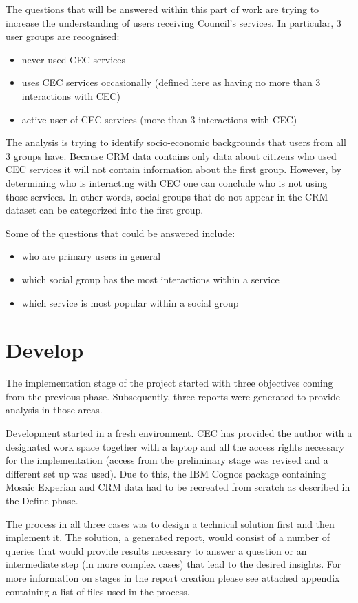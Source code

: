 The questions that will be answered within this part of work are trying to increase the understanding of users receiving Council’s services. In particular, 3 user groups are recognised:
\begin{itemize}
\item never used CEC services
\item uses CEC services occasionally (defined here as having no more than 3 interactions with CEC)
\item active user of CEC services (more than 3 interactions with CEC)
\end{itemize}

The analysis is trying to identify socio-economic backgrounds that users from all 3 groups have. Because CRM data contains only data about citizens who used CEC services it will not contain information about the first group. However, by determining who is interacting with CEC one can conclude who is not using those services. In other words, social groups that do not appear in the CRM dataset can be categorized into the first group.

Some of the questions that could be answered include:
\begin{itemize}
\item who are primary users in general
\item which social group has the most interactions within a service
\item which service is most popular within a social group
\end{itemize}

	\section{Develop}
	
The implementation stage of the project started with three objectives coming from the previous phase. Subsequently, three reports were generated to provide analysis in those areas.

Development started in a fresh environment. CEC has provided the author with a designated work space together with a laptop and all the access rights necessary for the implementation (access from the preliminary stage was revised and a different set up was used). Due to this, the IBM Cognos package containing Mosaic Experian and CRM data had to be recreated from scratch as described in the Define phase.

The process in all three cases was to design a technical solution first and then implement it. The solution, a generated report, would consist of a number of queries that would provide results necessary to answer a question or an intermediate step (in more complex cases) that lead to the desired insights. For more information on stages in the report creation please see attached appendix containing a list of files used in the process.
	
